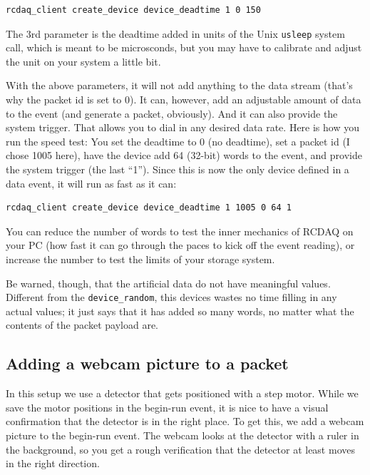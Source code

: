 \documentclass{article}[11pt]
\begin{document}
\begin{verbatim}
rcdaq_client create_device device_deadtime 1 0 150
\end{verbatim}

The 3rd parameter is the deadtime added in units of the Unix \verb|usleep|
system call, which is meant to be microsconds, but you may have to calibrate and 
adjust the unit on your system a little bit.  

With the above parameters, it will not add anything to the data stream
(that's why the packet id is set to 0). It can, however, add an
adjustable amount of data to the event (and generate a packet,
obviously). And it can also provide the system trigger. That allows
you to dial in any desired data rate. Here is how you run the speed
test: You set the deadtime to 0 (no deadtime), set a packet id (I chose 1005 here), 
have the device add 64 (32-bit) words to the event,  and provide the system
trigger (the last ``1''). Since this is now the only device defined in a data event,
it will run as fast as it can:

\begin{verbatim}
rcdaq_client create_device device_deadtime 1 1005 0 64 1
\end{verbatim}

You can reduce the number of words to test the inner mechanics of
RCDAQ on your PC (how fast it can go through the paces to kick off the
event reading), or increase the number to test the limits of your
storage system. 

Be warned, though, that the artificial data do not have meaningful
values. Different from the \verb|device_random|, this devices wastes
no time filling in any actual values; it just says that it has added
so many words, no matter what the contents of the packet payload are.

\subsection{Adding a webcam picture to a packet}

In this setup we use a detector that gets positioned with a step
motor. While we save the motor positions in the begin-run event, it is
nice to have a visual confirmation that the detector is in the right
place. To get this, we add a webcam picture to the begin-run
event. The webcam looks at the detector with a ruler in the
background, so you get a rough verification that the detector at least
moves in the right direction.
\end{document}
